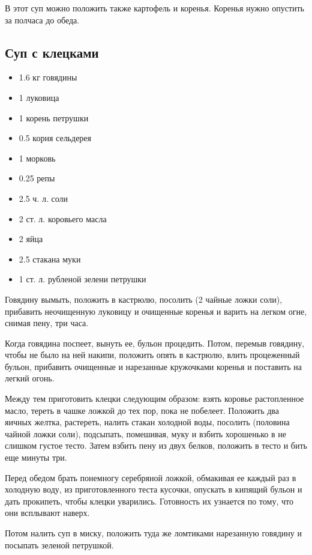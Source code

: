 В этот суп можно положить также картофель и коренья. Коренья нужно опустить за полчаса до обеда.

\subsection{Суп с клецками}\label{16sup-klecki}

\begin{itemize}
	\item 1.6 кг говядины 
	\item 1 луковица 
	\item 1 корень петрушки 
	\item 0.5 корня сельдерея 
	\item 1 морковь 
	\item 0.25 репы 
	\item 2.5 ч. л. соли 
	\item 2 ст. л. коровьего масла 
	\item 2 яйца 
	\item 2.5 стакана муки 
	\item 1 ст. л. рубленой зелени петрушки
\end{itemize}

Говядину вымыть, положить в кастрюлю, посолить (2 чайные ложки соли), прибавить неочищенную луковицу и очищенные коренья и варить на легком огне, снимая пену, три часа.

Когда говядина поспеет, вынуть ее, бульон процедить. Потом, перемыв говядину, чтобы не было на ней накипи, положить опять в кастрюлю, влить процеженный бульон, прибавить очищенные и нарезанные кружочками коренья и поставить на легкий огонь.

Между тем приготовить клецки следующим образом: взять коровье растопленное масло, тереть в чашке ложкой до тех пор, пока не побелеет. Положить два яичных желтка, растереть, налить стакан холодной воды, посолить (половина чайной ложки соли), подсыпать, помешивая, муку и взбить хорошенько в не слишком густое тесто. Затем взбить пену из двух белков, положить в тесто и бить еще минуты три.

Перед обедом брать понемногу серебряной ложкой, обмакивая ее каждый раз в холодную воду, из приготовленного теста кусочки, опускать в кипящий бульон и дать прокипеть, чтобы клецки уварились. Готовность их узнается по тому, что они всплывают наверх.

Потом налить суп в миску, положить туда же ломтиками нарезанную говядину и посыпать зеленой петрушкой.

